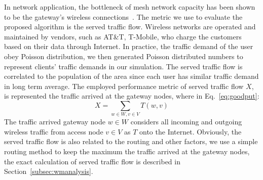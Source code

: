 In network application, the bottleneck of mesh network capacity has been shown to be the gateway's wireless 
connections~\cite{robinson2008adding}. The metric we use to evaluate the proposed algorithm is the served traffic flow.
Wireless networks are operated and maintained by vendors, such as AT\&T, T-Mobile, who charge the customers based on their data 
through Internet. In practice, the traffic demand of the user obey Poisson distribution\cite{saaty1961elements}, 
we then generated Poisson distributed numbers to represent clients' traffic demands in our simulation. The served traffic 
flow is correlated to the population of the area since each user has similar traffic demand in long term average. The 
employed performance metric of served traffic flow $X$, is represented the traffic arrived at the gateway nodes, where 
in Eq.~\ref{eq:goodput}:
\begin{equation}
\label{eq:goodput}
X=\sum_{w \in W, v \in V}T(w,v)
\end{equation}
The traffic arrived gateway node $w\in W$ considers all incoming and outgoing wireless traffic from access node $v\in V$ 
as $T$ onto the Internet. Obviously, the served traffic flow is also related to the routing and other factors, we use a 
simple routing method to keep the maximum the traffic arrived at the gateway nodes, the exact calculation of served traffic
flow is described in Section~\ref{subsec:wmanalysis}.


